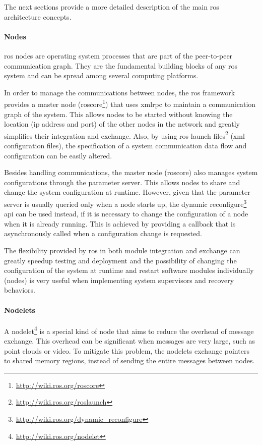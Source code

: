 The next sections provide a more detailed description of the main \gls{ros} architecture concepts.


\paragraph{Nodes}

\gls{ros} nodes are operating system processes that are part of the peer-to-peer communication graph. They are the fundamental building blocks of any \gls{ros} system and can be spread among several computing platforms.

In order to manage the communications between nodes, the \gls{ros} framework provides a master node (roscore\footnote{\url{http://wiki.ros.org/roscore}}) that uses \gls{xmlrpc} to maintain a communication graph of the system. This allows nodes to be started without knowing the location (\gls{ip} address and port) of the other nodes in the network and greatly simplifies their integration and exchange. Also, by using \gls{ros} launch files\footnote{\url{http://wiki.ros.org/roslaunch}} (\gls{xml} configuration files), the specification of a system communication data flow and configuration can be easily altered.

Besides handling communications, the master node (roscore) also manages system configurations through the parameter server. This allows nodes to share and change the system configuration at runtime. However, given that the parameter server is usually queried only when a node starts up, the dynamic reconfigure\footnote{\url{http://wiki.ros.org/dynamic_reconfigure}} \gls{api} can be used instead, if it is necessary to change the configuration of a node when it is already running. This is achieved by providing a callback that is asynchronously called when a configuration change is requested.

The flexibility provided by \gls{ros} in both module integration and exchange can greatly speedup testing and deployment and the possibility of changing the configuration of the system at runtime and restart software modules individually (nodes) is very useful when implementing system supervisors and recovery behaviors.


\paragraph{Nodelets}

A nodelet\footnote{\url{http://wiki.ros.org/nodelet}} is a special kind of node that aims to reduce the overhead of message exchange. This overhead can be significant when messages are very large, such as point clouds or video. To mitigate this problem, the nodelets exchange pointers to shared memory regions, instead of sending the entire messages between nodes.

